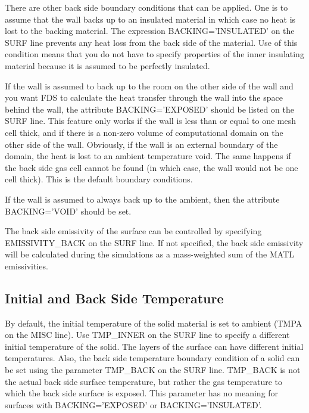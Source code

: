 \documentclass[11pt]{book}
\begin{document}
There are other back side boundary conditions that can be applied. One is to assume that the wall backs up to an insulated material in which case no heat is lost to the backing material. The expression {\ct BACKING='INSULATED'} on the {\ct SURF} line prevents any heat loss from the back side of the material. Use of this condition means that you  do not have to specify properties of the inner insulating material because it is assumed to be perfectly insulated.

If the wall is assumed to back up to the room on the other side of the wall and you want FDS to calculate the heat transfer through the wall into the space behind the wall, the attribute {\ct BACKING='EXPOSED'} should be listed on the {\ct SURF} line. This feature only works if the wall is less than or equal to one mesh cell thick, and if there is a non-zero volume of computational domain on the other side of the wall. Obviously, if the wall is an external boundary of the domain, the heat is lost to an ambient temperature void. The same happens if the back side gas cell cannot be found (in which case, the wall would not be one cell thick).  This is the default boundary conditions.

If the wall is assumed to always back up to the ambient, then the attribute {\ct BACKING='VOID'} should be set.

The back side emissivity of the surface can be controlled by specifying {\ct EMISSIVITY\_BACK} on the {\ct SURF} line. If not specified, the back side emissivity will be calculated during the simulations as a mass-weighted sum of the {\ct MATL} emissivities.

\subsection{Initial and Back Side Temperature}
\label{info:TMP_INNER}

By default, the initial temperature of the solid material is set to ambient ({\ct TMPA} on the {\ct MISC} line). Use {\ct TMP\_INNER} on the {\ct SURF} line to specify a different initial temperature of the solid. The layers of the surface can have different initial temperatures. Also, the back side temperature boundary condition of a solid can be set using the parameter {\ct TMP\_BACK} on the {\ct SURF} line. {\ct TMP\_BACK} is not the actual back side surface temperature, but rather the gas temperature to which the back side surface is exposed. This parameter has no meaning for surfaces with {\ct BACKING='EXPOSED'} or {\ct BACKING='INSULATED'}.
\end{document}
